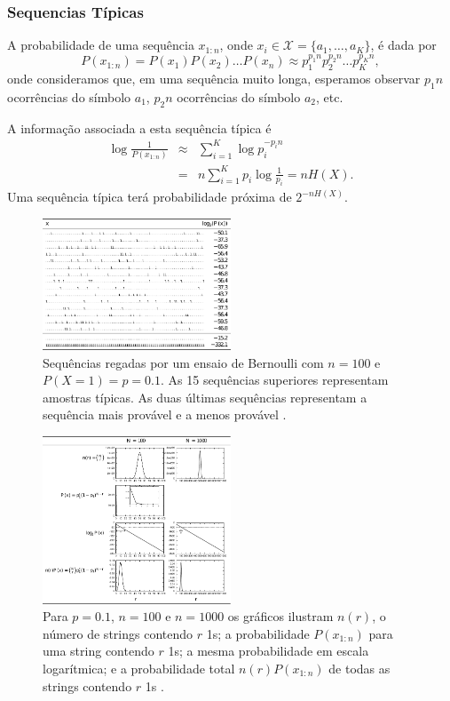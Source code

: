 \begin{frame}[allowframebreaks]
  \frametitle{Sequencias Típicas} 
  A probabilidade de uma sequência $x_{1:n}$, onde $x_i \in \mathcal{X} = \{a_1, \ldots, a_K\}$, é dada por
  \begin{equation}
  P(x_{1:n}) = P(x_1) P(x_2) \ldots P(x_n) \approx p_1^{p_1 n} p_2^{p_2 n} \ldots p_K^{p_K n} ,
  \end{equation}
  onde consideramos que, em uma sequência muito longa, esperamos observar $p_1 n$ ocorrências do símbolo $a_1$,
  $p_2 n$ ocorrências do símbolo $a_2$, etc.

  A informação associada a esta sequência típica é
  \begin{eqnarray}
  \log \frac{1}{P(x_{1:n})} &\approx& \sum_{i=1}^K \log p_i^{-p_i n} \\
                &=& n \sum_{i=1}^K p_i \log \frac{1}{p_i} = n H(X).
  \end{eqnarray}
  Uma sequência típica terá probabilidade próxima de $2^{-n H(X)}$.

  \framebreak
  \begin{figure}[h!]
  \centering
  \includegraphics[width=0.5\textwidth]{images/seq100mackay.pdf}
  \caption{Sequências regadas por um ensaio de Bernoulli com $n=100$ e $P(X=1) = p = 0.1$. 
        As 15 sequências superiores representam amostras típicas. As duas últimas sequências
        representam a sequência mais provável e a menos provável \cite{mackay2003}.}
  \label{fig:seq100mackay}
  \end{figure}

  \framebreak
  \begin{figure}[h!]
  \centering
  \includegraphics[width=0.5\textwidth]{images/seq100mackay2.pdf}
  \caption{Para $p=0.1$, $n=100$ e $n=1000$ os gráficos ilustram $n(r)$, o número de strings contendo
        $r$ 1s; a probabilidade $P(x_{1:n})$ para uma string contendo $r$ 1s; a mesma probabilidade
        em escala logarítmica; e a probabilidade total $n(r) P(x_{1:n})$ de todas as strings contendo $r$ 1s \cite{mackay2003}.}
  \label{fig:seq100mackay2}
  \end{figure}



\end{frame}
